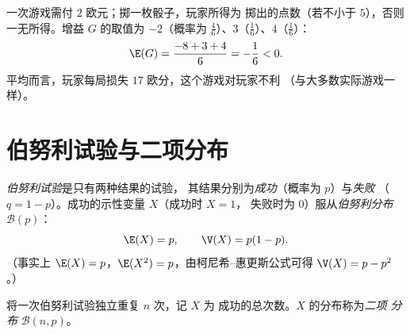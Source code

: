 \begin{example}[公平游戏]\label{ex:g12:randvar:game}
一次游戏需付 $2$ 欧元；掷一枚骰子，玩家所得为
掷出的点数（若不小于 $5$），否则一无所得。增益 $G$ 的取值为
$-2$（概率为 $\frac46$）、$3$（$\frac16$）、$4$（$\frac16$）：
\[
\E(G) = \frac{-8 + 3 + 4}{6} = -\frac{1}{6} < 0 .
\]
平均而言，玩家每局损失 $17$ 欧分，这个游戏对玩家不利
（与大多数实际游戏一样）。
\end{example}

\section{伯努利试验与二项分布}

\begin{definition}[伯努利分布]\label{def:g12:randvar:bernoulli}
\emph{伯努利试验}是只有两种结果的试验，
其结果分别为\emph{成功}（概率为 $p$）与\emph{失败}
（$q = 1 - p$）。成功的示性变量 $X$（成功时 $X = 1$，
失败时为 $0$）服从\emph{伯努利分布} $\mathcal B(p)$：
\[
\E(X) = p, \qquad \V(X) = p(1-p) .
\]
（事实上 $\E(X) = p$，$\E(X^2) = p$，由柯尼希--惠更斯公式可得
$\V(X) = p - p^2$。）
\end{definition}

\begin{definition}[二项分布]\label{def:g12:randvar:binomial}
将一次伯努利试验独立重复 $n$ 次，记 $X$ 为
成功的总次数。$X$ 的分布称为\emph{二项
分布} $\mathcal B(n, p)$。
\end{definition}

